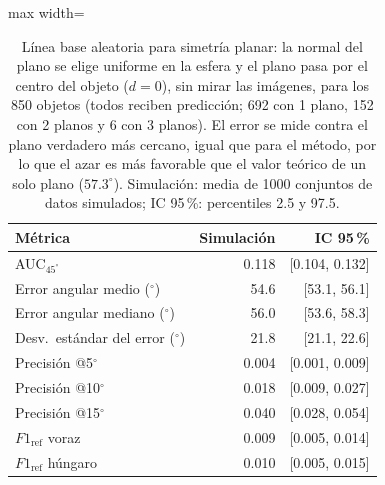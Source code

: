 \begin{table}[htbp]
\centering
\caption{Línea base aleatoria para simetría planar: la normal del plano se elige uniforme en la esfera y el plano pasa por el centro del objeto ($d=0$), sin mirar las imágenes, para los 850 objetos (todos reciben predicción; 692 con 1 plano, 152 con 2 planos y 6 con 3 planos). El error se mide contra el plano verdadero más cercano, igual que para el método, por lo que el azar es más favorable que el valor teórico de un solo plano ($57.3^\circ$). Simulación: media de 1000 conjuntos de datos simulados; IC 95\,\%: percentiles 2.5 y 97.5.}
\label{tab:base_plane_azar}
\begin{adjustbox}{max width=\textwidth}
\begin{tabular}{lrr}
\toprule
Métrica & Simulación & IC 95\,\% \\
\midrule
AUC$_{45^\circ}$ & 0.118 & [0.104, 0.132] \\
Error angular medio ($^\circ$) & 54.6 & [53.1, 56.1] \\
Error angular mediano ($^\circ$) & 56.0 & [53.6, 58.3] \\
Desv.\ estándar del error ($^\circ$) & 21.8 & [21.1, 22.6] \\
Precisión @5$^\circ$ & 0.004 & [0.001, 0.009] \\
Precisión @10$^\circ$ & 0.018 & [0.009, 0.027] \\
Precisión @15$^\circ$ & 0.040 & [0.028, 0.054] \\
$F1_{\mathrm{ref}}$ voraz & 0.009 & [0.005, 0.014] \\
$F1_{\mathrm{ref}}$ húngaro & 0.010 & [0.005, 0.015] \\
\bottomrule
\end{tabular}
\end{adjustbox}
\end{table}

